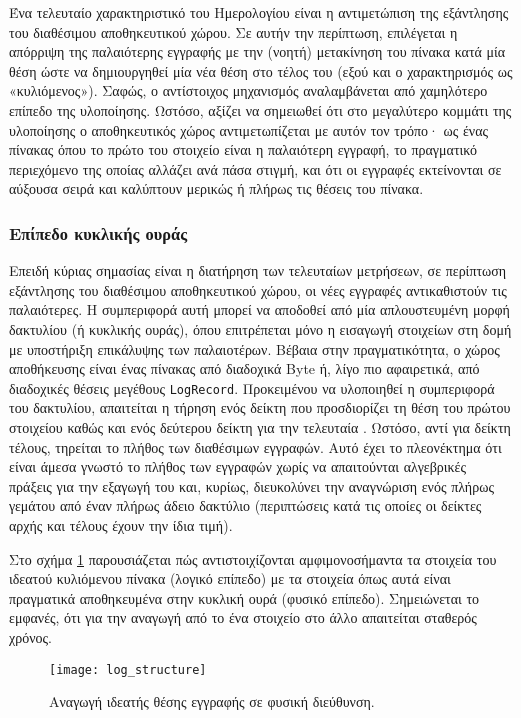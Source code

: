 Ένα τελευταίο χαρακτηριστικό του Ημερολογίου είναι η αντιμετώπιση της εξάντλησης
του διαθέσιμου αποθηκευτικού χώρου. Σε αυτήν την περίπτωση, επιλέγεται η
απόρριψη της παλαιότερης εγγραφής με την (νοητή) μετακίνηση του πίνακα κατά μία
θέση ώστε να δημιουργηθεί μία νέα θέση στο τέλος του (εξού και ο χαρακτηρισμός
ως «κυλιόμενος»). Σαφώς, ο αντίστοιχος μηχανισμός αναλαμβάνεται από χαμηλότερο
επίπεδο της υλοποίησης. Ωστόσο, αξίζει να σημειωθεί ότι στο μεγαλύτερο κομμάτι
της υλοποίησης ο αποθηκευτικός χώρος αντιμετωπίζεται με αυτόν τον τρόπο· ως ένας
πίνακας όπου το πρώτο του στοιχείο είναι η παλαιότερη εγγραφή, το πραγματικό
περιεχόμενο της οποίας αλλάζει ανά πάσα στιγμή, και ότι οι εγγραφές εκτείνονται
σε αύξουσα σειρά και καλύπτουν μερικώς ή πλήρως τις θέσεις του πίνακα.

\subsubsection{Επίπεδο κυκλικής ουράς}

Επειδή κύριας σημασίας είναι η διατήρηση των τελευταίων μετρήσεων, σε περίπτωση
εξάντλησης του διαθέσιμου αποθηκευτικού χώρου, οι νέες εγγραφές αντικαθιστούν
τις παλαιότερες. Η συμπεριφορά αυτή μπορεί να αποδοθεί από μία απλουστευμένη
μορφή δακτυλίου (ή κυκλικής ουράς), όπου επιτρέπεται μόνο η εισαγωγή στοιχείων
στη δομή με υποστήριξη επικάλυψης των παλαιοτέρων. Βέβαια στην πραγματικότητα, ο
χώρος αποθήκευσης είναι ένας πίνακας από διαδοχικά Byte ή, λίγο πιο αφαιρετικά,
από διαδοχικές θέσεις μεγέθους \verb~LogRecord~. Προκειμένου να υλοποιηθεί η
συμπεριφορά του δακτυλίου, απαιτείται η τήρηση ενός δείκτη που προσδιορίζει τη
θέση του πρώτου στοιχείου καθώς και ενός δεύτερου δείκτη για την τελευταία
\parencite[131]{kolias04}. Ωστόσο, αντί για δείκτη τέλους, τηρείται το πλήθος
των διαθέσιμων εγγραφών. Αυτό έχει το πλεονέκτημα ότι είναι άμεσα γνωστό το
πλήθος των εγγραφών χωρίς να απαιτούνται αλγεβρικές πράξεις για την εξαγωγή του
και, κυρίως, διευκολύνει την αναγνώριση ενός πλήρως γεμάτου από έναν πλήρως
άδειο δακτύλιο (περιπτώσεις κατά τις οποίες οι δείκτες αρχής και τέλους έχουν
την ίδια τιμή).

Στο σχήμα \ref{fig:log:structure} παρουσιάζεται πώς αντιστοιχίζονται
αμφιμονοσήμαντα τα στοιχεία του ιδεατού κυλιόμενου πίνακα
(λογικό επίπεδο) με τα στοιχεία όπως αυτά είναι πραγματικά
αποθηκευμένα στην κυκλική ουρά (φυσικό επίπεδο). Σημειώνεται το
εμφανές, ότι για την αναγωγή από το ένα στοιχείο στο άλλο απαιτείται σταθερός
χρόνος.

\begin{figure}
    \caption{Αναγωγή ιδεατής θέσης εγγραφής σε φυσική διεύθυνση.
    \label{fig:log:structure}}
    \begin{center}%
    \texttt{[image: log\_structure]}
    \end{center}
\end{figure}


